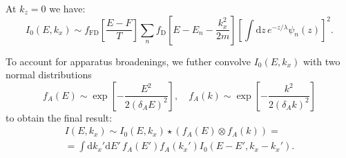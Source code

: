 \documentclass[10pt]{article}
\newcommand{\dd}{\mathrm{d}}
\begin{document}
At $k_z = 0$ we have:
\begin{equation}
	I_0(E, k_x) \sim f_{\mathrm{FD}}\left[ \frac{E - F}{T} \right] \sum_n
		f_{\mathrm{D}}\left[ E - E_n - \frac{k_x^2}{2m} \right]
		\left[ \int \dd z \, e^{- z / \lambda}
		\psi_n(z) \right]^2.
\end{equation}

To account for apparatus broadenings, we futher convolve $I_0(E, k_x)$ with
two normal distributions
\begin{equation}
	f_A(E) \sim \exp\left[ -\frac{E^2}{2(\delta_A E)^2} \right], \quad
	f_A(k) \sim \exp\left[ -\frac{k^2}{2(\delta_A k)^2} \right]
\end{equation}
to obtain the final result:
\begin{multline}
	I(E, k_x) \sim I_0(E, k_x) \star (f_A(E) \otimes f_A(k)) = \\
	= \int \dd k_x' \dd E' \, f_A(E') f_A(k_x') I_0(E - E', k_x - k_x').
\end{multline}



\end{document}
